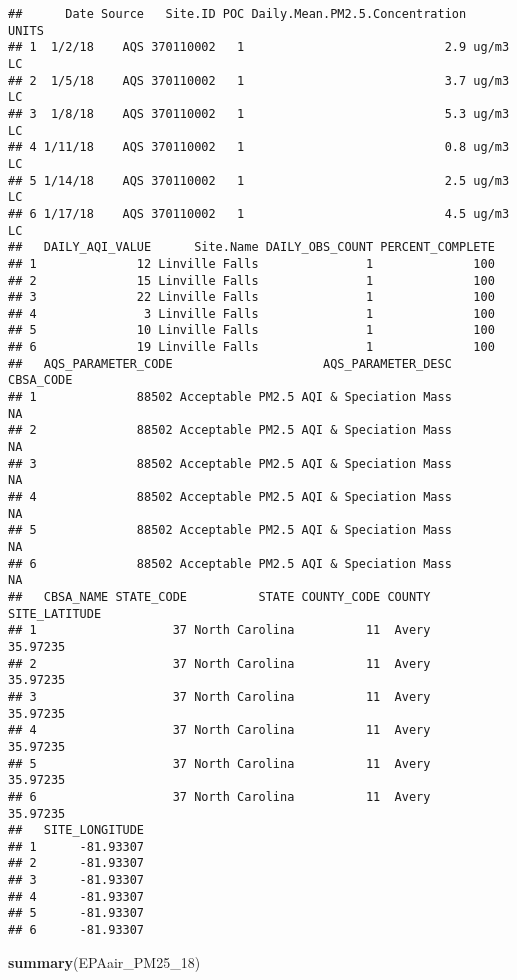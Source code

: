 \documentclass[]{article}
\newenvironment{Shaded}{\begin{snugshade}}{\end{snugshade}}
\newcommand{\KeywordTok}[1]{\textcolor[rgb]{0.13,0.29,0.53}{\textbf{#1}}}
\newcommand{\DecValTok}[1]{\textcolor[rgb]{0.00,0.00,0.81}{#1}}
\newcommand{\NormalTok}[1]{#1}
\begin{document}
\begin{verbatim}
##      Date Source   Site.ID POC Daily.Mean.PM2.5.Concentration    UNITS
## 1  1/2/18    AQS 370110002   1                            2.9 ug/m3 LC
## 2  1/5/18    AQS 370110002   1                            3.7 ug/m3 LC
## 3  1/8/18    AQS 370110002   1                            5.3 ug/m3 LC
## 4 1/11/18    AQS 370110002   1                            0.8 ug/m3 LC
## 5 1/14/18    AQS 370110002   1                            2.5 ug/m3 LC
## 6 1/17/18    AQS 370110002   1                            4.5 ug/m3 LC
##   DAILY_AQI_VALUE      Site.Name DAILY_OBS_COUNT PERCENT_COMPLETE
## 1              12 Linville Falls               1              100
## 2              15 Linville Falls               1              100
## 3              22 Linville Falls               1              100
## 4               3 Linville Falls               1              100
## 5              10 Linville Falls               1              100
## 6              19 Linville Falls               1              100
##   AQS_PARAMETER_CODE                     AQS_PARAMETER_DESC CBSA_CODE
## 1              88502 Acceptable PM2.5 AQI & Speciation Mass        NA
## 2              88502 Acceptable PM2.5 AQI & Speciation Mass        NA
## 3              88502 Acceptable PM2.5 AQI & Speciation Mass        NA
## 4              88502 Acceptable PM2.5 AQI & Speciation Mass        NA
## 5              88502 Acceptable PM2.5 AQI & Speciation Mass        NA
## 6              88502 Acceptable PM2.5 AQI & Speciation Mass        NA
##   CBSA_NAME STATE_CODE          STATE COUNTY_CODE COUNTY SITE_LATITUDE
## 1                   37 North Carolina          11  Avery      35.97235
## 2                   37 North Carolina          11  Avery      35.97235
## 3                   37 North Carolina          11  Avery      35.97235
## 4                   37 North Carolina          11  Avery      35.97235
## 5                   37 North Carolina          11  Avery      35.97235
## 6                   37 North Carolina          11  Avery      35.97235
##   SITE_LONGITUDE
## 1      -81.93307
## 2      -81.93307
## 3      -81.93307
## 4      -81.93307
## 5      -81.93307
## 6      -81.93307
\end{verbatim}

\begin{Shaded}
\begin{Highlighting}[]
\KeywordTok{summary}\NormalTok{(EPAair_PM25_}\DecValTok{18}\NormalTok{)}
\end{Highlighting}
\end{Shaded}
\end{document}
